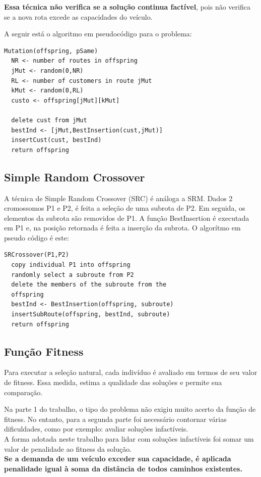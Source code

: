 \documentclass[conference]{IEEEtran}
\begin{document}
\textbf{Essa técnica não verifica se a solução continua factível}, pois não verifica se a nova rota excede as capacidades do veículo.

A seguir está o algoritmo em pseudocódigo para o problema:

\newpage

\begin{verbatim}
Mutation(offspring, pSame)
  NR <- number of routes in offspring
  jMut <- random(0,NR)
  RL <- number of customers in route jMut
  kMut <- random(0,RL)
  custo <- offspring[jMut][kMut]

  delete cust from jMut
  bestInd <- [jMut,BestInsertion(cust,jMut)]
  insertCust(cust, bestInd)
  return offspring
\end{verbatim}

\subsection{Simple Random Crossover}
A técnica de Simple Random Crossover (SRC) é análoga a SRM. Dados 2 cromossomos P1 e P2, é feita a seleção de uma subrota de P2. Em seguida, os elementos da subrota são removidos de P1. A função BestInsertion é executada em P1 e, na posição retornada é feita a inserção da subrota. O algorítmo em pseudo código é este:

\begin{verbatim}
SRCrossover(P1,P2)
  copy individual P1 into offspring
  randomly select a subroute from P2
  delete the members of the subroute from the 
  offspring
  bestInd <- BestInsertion(offspring, subroute)
  insertSubRoute(offspring, bestInd, subroute)
  return offspring
\end{verbatim}

\subsection{Função Fitness}
Para executar a seleção natural, cada indivíduo é avaliado em termos de seu valor de fitness. Essa medida, estima a qualidade das soluções e permite sua comparação.

Na parte 1 do trabalho, o tipo do problema não exigiu muito acerto da função de fitness. No entanto, para a segunda parte foi necessário contornar várias dificuldades, como por exemplo: avaliar soluções infactíveis.\\
A forma adotada neste trabalho para lidar com soluções infactíveis foi somar um valor de penalidade ao fitness da solução.\\
\textbf{Se a demanda de um veículo exceder sua capacidade, é aplicada penalidade igual à soma da distância de todos caminhos existentes.}
\end{document}
